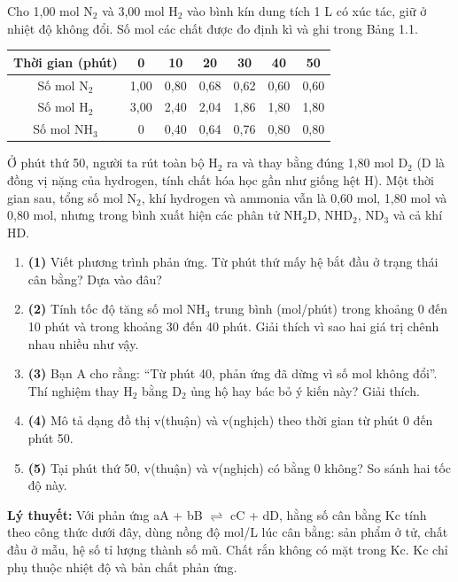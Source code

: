 \begin{readingpassage}
Cho 1,00 mol N$_{2}$ và 3,00 mol H$_{2}$ vào bình kín dung tích 1 L có xúc tác, giữ ở nhiệt độ không đổi. Số mol các chất được đo định kì và ghi trong Bảng 1.1.

\Needspace{5cm}
{\small
\begin{center}
\renewcommand{\arraystretch}{1.3}
\begin{tabular}{|c|c|c|c|c|c|c|}
\hline
\rowcolor{pastelBlue}
\textbf{Thời gian (phút)} & \textbf{0} & \textbf{10} & \textbf{20} & \textbf{30} & \textbf{40} & \textbf{50} \\
\hline
Số mol N$_{2}$ & 1,00 & 0,80 & 0,68 & 0,62 & 0,60 & 0,60 \\
\hline
Số mol H$_{2}$ & 3,00 & 2,40 & 2,04 & 1,86 & 1,80 & 1,80 \\
\hline
Số mol NH$_{3}$ & 0 & 0,40 & 0,64 & 0,76 & 0,80 & 0,80 \\
\hline
\end{tabular}
\end{center}
}
Ở phút thứ 50, người ta rút toàn bộ H$_{2}$ ra và thay bằng đúng 1,80 mol D$_{2}$ (D là đồng vị nặng của hydrogen, tính chất hóa học gần như giống hệt H). Một thời gian sau, tổng số mol N$_{2}$, khí hydrogen và ammonia vẫn là 0,60 mol, 1,80 mol và 0,80 mol, nhưng trong bình xuất hiện các phân tử NH$_{2}$D, NHD$_{2}$, ND$_{3}$ và cả khí HD.

\end{readingpassage}
\qhead
\begin{enumerate}[label={}, leftmargin=0.5em, itemsep=6pt]
\item \textbf{(1)} Viết phương trình phản ứng. Từ phút thứ mấy hệ bắt đầu ở trạng thái cân bằng? Dựa vào đâu? 
\item \textbf{(2)} Tính tốc độ tăng số mol NH$_{3}$ trung bình (mol/phút) trong khoảng 0 đến 10 phút và trong khoảng 30 đến 40 phút. Giải thích vì sao hai giá trị chênh nhau nhiều như vậy. 
\item \textbf{(3)} Bạn A cho rằng: ``Từ phút 40, phản ứng đã dừng vì số mol không đổi''. Thí nghiệm thay H$_{2}$ bằng D$_{2}$ ủng hộ hay bác bỏ ý kiến này? Giải thích. 
\item \textbf{(4)} Mô tả dạng đồ thị v(thuận) và v(nghịch) theo thời gian từ phút 0 đến phút 50. 
\item \textbf{(5)} Tại phút thứ 50, v(thuận) và v(nghịch) có bằng 0 không? So sánh hai tốc độ này. 
\end{enumerate}
\textbf{Lý thuyết:} Với phản ứng aA + bB $\rightleftharpoons$ cC + dD, hằng số cân bằng Kc tính theo công thức dưới đây, dùng nồng độ mol/L lúc cân bằng: sản phẩm ở tử, chất đầu ở mẫu, hệ số tỉ lượng thành số mũ. Chất rắn không có mặt trong Kc. Kc chỉ phụ thuộc nhiệt độ và bản chất phản ứng.

